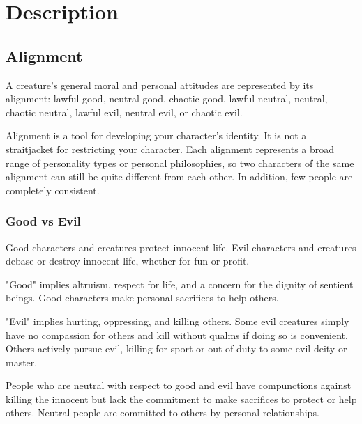 \chapter{Description}\label{chapter:Description}

\section{Alignment}

A creature's general moral and personal attitudes are represented by its alignment: 
lawful good, neutral good, chaotic good, lawful neutral, neutral, chaotic neutral, 
lawful evil, neutral evil, or chaotic evil.

Alignment is a tool for developing your character's identity. It is not a straitjacket 
for restricting your character. Each alignment represents a broad range of personality 
types or personal philosophies, so two characters of the same alignment can still 
be quite different from each other. In addition, few people are completely consistent.

\subsection{Good vs Evil}

Good characters and creatures protect innocent life. Evil characters and creatures 
debase or destroy innocent life, whether for fun or profit.

"Good" implies altruism, respect for life, and a concern for the dignity of sentient 
beings. Good characters make personal sacrifices to help others.

"Evil" implies hurting, oppressing, and killing others. Some evil creatures simply 
have no compassion for others and kill without qualms if doing so is convenient. 
Others actively pursue evil, killing for sport or out of duty to some evil deity 
or master. 

People who are neutral with respect to good and evil have compunctions against 
killing the innocent but lack the commitment to make sacrifices to protect or help 
others. Neutral people are committed to others by personal relationships. 

